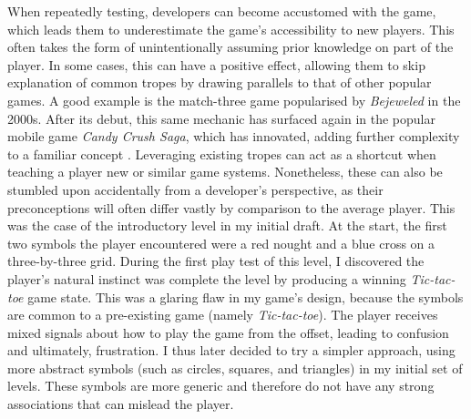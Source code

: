 \documentclass[final]{cmpreport}
\begin{document}
When repeatedly testing, developers can become accustomed with the game, which leads them to underestimate the game's accessibility to new players. This often takes the form of unintentionally assuming prior knowledge on part of the player. In some cases, this can have a positive effect, allowing them to skip explanation of common tropes by drawing parallels to that of other popular games. A good example is the match-three game popularised by \textit{Bejeweled} in the 2000s. After its debut, this same mechanic has surfaced again in the popular mobile game \textit{Candy Crush Saga}, which has innovated, adding further complexity to a familiar concept \citep{Juul}. Leveraging existing tropes can act as a shortcut when teaching a player new or similar game systems. Nonetheless, these can also be stumbled upon accidentally from a developer's perspective, as their preconceptions will often differ vastly by comparison to the average player. This was the case of the introductory level in my initial draft. At the start, the first two symbols the player encountered were a red nought and a blue cross on a three-by-three grid. During the first play test of this level, I discovered the player's natural instinct was complete the level by producing a winning \emph{Tic-tac-toe} game state. This was a glaring flaw in my game's design, because the symbols are common to a pre-existing game (namely \emph{Tic-tac-toe}). The player receives mixed signals about how to play the game from the offset, leading to confusion and ultimately, frustration. I thus later decided to try a simpler approach, using more abstract symbols (such as circles, squares, and triangles) in my initial set of levels. These symbols are more generic and therefore do not have any strong associations that can mislead the player.
\end{document}
